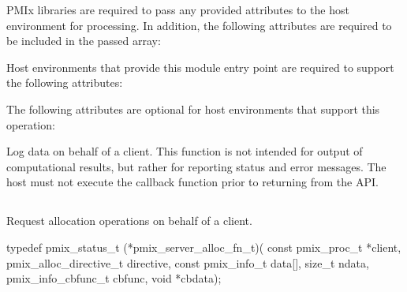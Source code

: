 \reqattrstart
\ac{PMIx} libraries are required to pass any provided attributes to the host environment for processing. In addition, the following attributes are required to be included in the passed  array:


\divider

Host environments that provide this module entry point are required to support the following attributes:


\reqattrend

\optattrstart
The following attributes are optional for host environments that support this operation:


\optattrend

\descr

Log data on behalf of a client. This function is not intended for output of computational results, but rather for reporting status and error messages. The host must not execute the callback function prior to returning from the \ac{API}.


\subsection{}

\summary

Request allocation operations on behalf of a client.

\format

\cspecificstart
\begin{codepar}
typedef pmix_status_t (*pmix_server_alloc_fn_t)(
                             const pmix_proc_t *client,
                             pmix_alloc_directive_t directive,
                             const pmix_info_t data[],
                             size_t ndata,
                             pmix_info_cbfunc_t cbfunc,
                             void *cbdata);
\end{codepar}
\cspecificend

